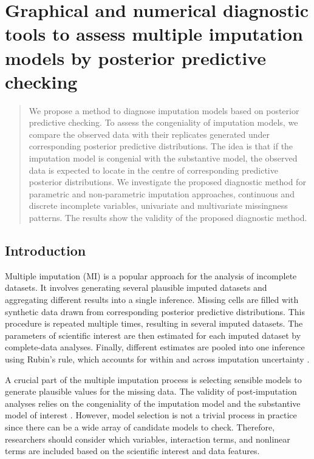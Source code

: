 \chapter{Graphical and numerical diagnostic tools to assess multiple imputation models by posterior predictive checking}
\label{chap6}
	\begin{abstract}
		We propose a method to diagnose imputation models based on posterior predictive checking. To assess the congeniality of imputation models, we compare the observed data with their replicates generated under corresponding posterior predictive distributions. The idea is that if the imputation model is congenial with the substantive model, the observed data is expected to locate in the centre of corresponding predictive posterior distributions. We investigate the proposed diagnostic method for parametric and non-parametric imputation approaches, continuous and discrete incomplete variables, univariate and multivariate missingness patterns. The results show the validity of the proposed diagnostic method.  	
	\end{abstract}
	
	\section{Introduction}
	\label{sec:6.1}
	Multiple imputation (MI) is a popular approach for the analysis of incomplete datasets. It involves generating several plausible imputed datasets and aggregating different results into a single inference. Missing cells are filled with synthetic data drawn from corresponding posterior predictive distributions. This procedure is repeated multiple times, resulting in several imputed datasets. The parameters of scientific interest are then estimated for each imputed dataset by complete-data analyses. Finally, different estimates are pooled into one inference using Rubin's rule, which accounts for within and across imputation uncertainty \citep{RubinD1987}. 
	
	A crucial part of the multiple imputation process is selecting sensible models to generate plausible values for the missing data. The validity of post-imputation analyses relies on the congeniality of the imputation model and the substantive model of interest \citep{meng1994multiple}. However, model selection is not a trivial process in practice since there can be a wide array of candidate models to check. Therefore, researchers should consider which variables, interaction terms, and nonlinear terms are included based on the scientific interest and data features.  
	
